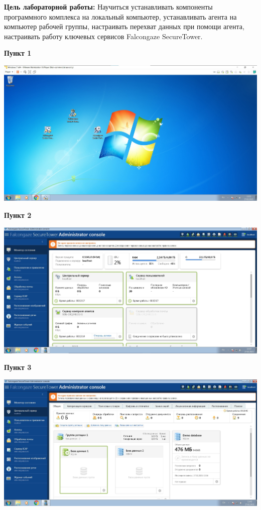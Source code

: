 \documentclass[a4paper,14pt]{extarticle}
\begin{document}
    \textbf{Цель лабораторной работы:}
    Научиться устанавливать компоненты программного комплекса на локальный компьютер, 
    устанавливать агента на компьютер рабочей группы, настраивать перехват данных при 
    помощи агента, настраивать работу ключевых сервисов Falcongaze SecureTower.

    \textbf{Пункт 1} \\
    \begin{center}
        \includegraphics[scale=0.25]{pics/1.jpg}
    \end{center}

    \textbf{Пункт 2} \\
    \begin{center}
        \includegraphics[scale=0.25]{pics/2.jpg}
    \end{center}

    \textbf{Пункт 3} \\
    \begin{center}
        \includegraphics[scale=0.25]{pics/3.jpg}
    \end{center}
\end{document}
